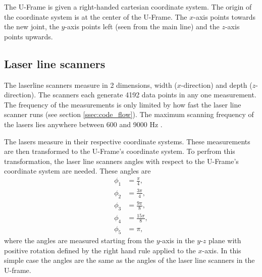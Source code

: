 The U-Frame is given a right-handed cartesian coordinate system. The origin of the coordinate system is at the center of the U-Frame. The $x$-axis points towards the new joint, the $y$-axis points left (seen from the main line) and the $z$-axis points upwards. 

\subsection{Laser line scanners} \label{ssec:laser_line_scanners}
The laserline scanners measure in 2 dimensions, width ($x$-direction) and depth ($z$-direction). The scanners each generate 4192 data points in any one measurement. The frequency of the measurements is only limited by how fast the laser line scanner runs (see section \ref{ssec:code_flow}). The maximum scanning frequency of the lasers lies anywhere between 600 and 9000 Hz \cite{gocator2650datasheet}.

The lasers measure in their respective coordinate systems. These measurements are then transformed to the U-Frame's coordinate system. To perfrom this transformation, the laser line scanners angles with respect to the U-Frame's coordinate system are needed. These angles are 
\begin{align}
    \phi_1    & = \frac{\pi}{4},                              \\
    \phi_2    & = \frac{3\pi}{4},                             \\
    \phi_3    & = \frac{9\pi}{8},                             \\
    \phi_4    & = \frac{15\pi}{8},                            \\
    \phi_5    & = \pi,
    \label{eq:laser_angles}
\end{align}
where the angles are measured starting from the $y$-axis in the $y$-$z$ plane with positive rotation defined by the right hand rule applied to the $x$-axis. In this simple case the angles are the same as the angles of the laser line scanners in the U-frame.

